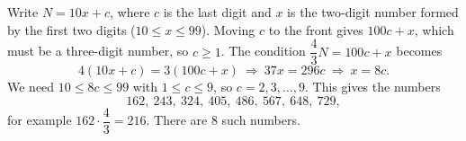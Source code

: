 Write $N=10x+c$, where $c$ is the last digit and $x$ is the two-digit number formed by the first two digits ($10\le x\le99$). Moving $c$ to the front gives $100c+x$, which must be a three-digit number, so $c\ge1$. The condition $\dfrac{4}{3}N=100c+x$ becomes
\[
4(10x+c)=3(100c+x)\ \Longrightarrow\ 37x=296c\ \Longrightarrow\ x=8c .
\]
We need $10\le8c\le99$ with $1\le c\le9$, so $c=2,3,\dots,9$. This gives the numbers
\[
162,\ 243,\ 324,\ 405,\ 486,\ 567,\ 648,\ 729,
\]
for example $162\cdot\dfrac{4}{3}=216$. There are $\boxed{8}$ such numbers.
